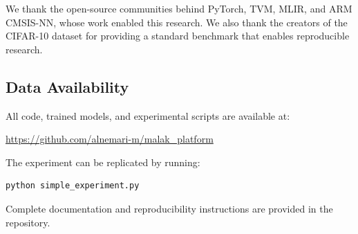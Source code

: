 We thank the open-source communities behind PyTorch, TVM, MLIR, and ARM CMSIS-NN, whose work enabled this research. We also thank the creators of the CIFAR-10 dataset for providing a standard benchmark that enables reproducible research.

\subsection*{Data Availability}

All code, trained models, and experimental scripts are available at:
\begin{center}
\url{https://github.com/alnemari-m/malak_platform}
\end{center}

The experiment can be replicated by running:
\begin{verbatim}
python simple_experiment.py
\end{verbatim}

Complete documentation and reproducibility instructions are provided in the repository.
